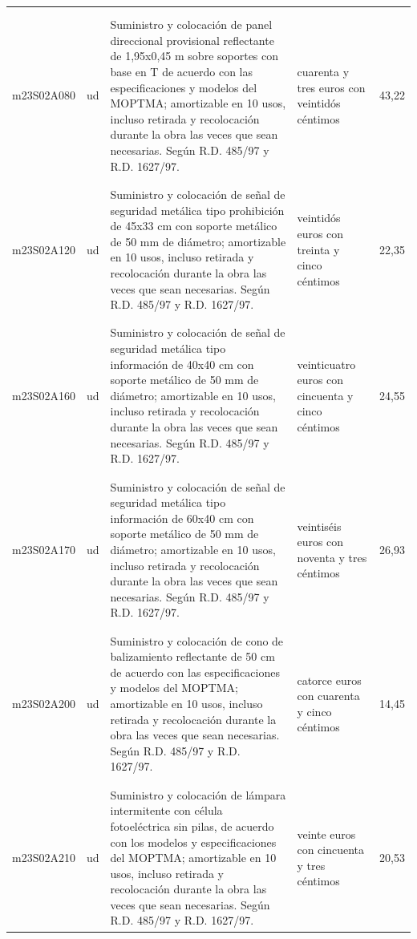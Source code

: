 \begin{supertabular}{|l|l|p{5cm}|p{3cm}|r|}
&&&&\\%
&&&&\\%
m23S02A080&ud&Suministro y colocación de panel direccional provisional reflectante de 1,95x0,45 m sobre soportes con base en T de acuerdo con las especificaciones y modelos del MOPTMA; amortizable en 10 usos, incluso retirada y recolocación durante la obra las veces que sean necesarias. Según R.D. 485/97 y R.D. 1627/97.&cuarenta y tres euros con veintidós céntimos&43,22\\%
&&&&\\%
&&&&\\%
m23S02A120&ud&Suministro y colocación de señal de seguridad metálica tipo prohibición de 45x33 cm con soporte metálico de 50 mm de diámetro; amortizable en 10 usos, incluso retirada y recolocación durante la obra las veces que sean necesarias. Según R.D. 485/97 y R.D. 1627/97.&veintidós euros con treinta y cinco céntimos&22,35\\%
&&&&\\%
&&&&\\%
m23S02A160&ud&Suministro y colocación de señal de seguridad metálica tipo información de 40x40 cm con soporte metálico de 50 mm de diámetro; amortizable en 10 usos, incluso retirada y recolocación durante la obra las veces que sean necesarias. Según R.D. 485/97 y R.D. 1627/97.&veinticuatro euros con cincuenta y cinco céntimos&24,55\\%
&&&&\\%
&&&&\\%
m23S02A170&ud&Suministro y colocación de señal de seguridad metálica tipo información de 60x40 cm con soporte metálico de 50 mm de diámetro; amortizable en 10 usos, incluso retirada y recolocación durante la obra las veces que sean necesarias. Según R.D. 485/97 y R.D. 1627/97.&veintiséis euros con noventa y tres céntimos&26,93\\%
&&&&\\%
&&&&\\%
m23S02A200&ud&Suministro y colocación de cono de balizamiento reflectante de 50 cm de acuerdo con las especificaciones y modelos del MOPTMA; amortizable en 10 usos, incluso retirada y recolocación durante la obra las veces que sean necesarias. Según R.D. 485/97 y R.D. 1627/97.&catorce euros con cuarenta y cinco céntimos&14,45\\%
&&&&\\%
&&&&\\%
m23S02A210&ud&Suministro y colocación de lámpara intermitente con célula fotoeléctrica sin pilas, de acuerdo con los modelos y especificaciones del MOPTMA; amortizable en 10 usos, incluso retirada y recolocación durante la obra las veces que sean necesarias. Según R.D. 485/97 y R.D. 1627/97.&veinte euros con cincuenta y tres céntimos&20,53\\%

\end{supertabular}
